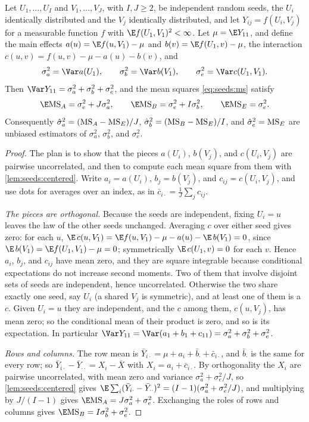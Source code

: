 \begin{refsection}
\begin{theorem}\label{thm:seeds:components}
Let $U_1,\dots,U_I$ and $V_1,\dots,V_J$, with $I,J\ge2$, be independent random seeds, the $U_i$ identically distributed and the $V_j$ identically distributed, and let $Y_{ij}=f(U_i,V_j)$ for a measurable function $f$ with $\E f(U_1,V_1)^2<\infty$. Let $\mu=\E Y_{11}$, and define the main effects $a(u)=\E f(u,V_1)-\mu$ and $b(v)=\E f(U_1,v)-\mu$, the interaction $c(u,v)=f(u,v)-\mu-a(u)-b(v)$, and
\[
\sigma_a^2=\Var a(U_1),\qquad\sigma_b^2=\Var b(V_1),\qquad\sigma_e^2=\Var c(U_1,V_1).
\]
Then $\Var Y_{11}=\sigma_a^2+\sigma_b^2+\sigma_e^2$, and the mean squares \eqref{eq:seeds:ms} satisfy
\[
\E\seedsMS A=\sigma_e^2+J\sigma_a^2,\qquad\E\seedsMS B=\sigma_e^2+I\sigma_b^2,\qquad\E\seedsMS E=\sigma_e^2 .
\]
Consequently $\hat\sigma_a^2=(\mathrm{MS}_{A}-\mathrm{MS}_{E})/J$, $\hat\sigma_b^2=(\mathrm{MS}_{B}-\mathrm{MS}_{E})/I$, and $\hat\sigma_e^2=\mathrm{MS}_{E}$ are unbiased estimators of $\sigma_a^2$, $\sigma_b^2$, and $\sigma_e^2$.
\end{theorem}

\begin{proof}
The plan is to show that the pieces $a(U_i)$, $b(V_j)$, and $c(U_i,V_j)$ are pairwise uncorrelated, and then to compute each mean square from them with \cref{lem:seeds:centered}. Write $a_i=a(U_i)$, $b_j=b(V_j)$, and $c_{ij}=c(U_i,V_j)$, and use dots for averages over an index, as in $\bar c_{i\cdot}=\frac1J\sum_jc_{ij}$.

\emph{The pieces are orthogonal.} Because the seeds are independent, fixing $U_i=u$ leaves the law of the other seeds unchanged. Averaging $c$ over either seed gives zero: for each $u$, $\E\,c(u,V_1)=\E f(u,V_1)-\mu-a(u)-\E\,b(V_1)=0$, since $\E\,b(V_1)=\E f(U_1,V_1)-\mu=0$; symmetrically $\E\,c(U_1,v)=0$ for each $v$. Hence $a_i$, $b_j$, and $c_{ij}$ have mean zero, and they are square integrable because conditional expectations do not increase second moments. Two of them that involve disjoint sets of seeds are independent, hence uncorrelated. Otherwise the two share exactly one seed, say $U_i$ (a shared $V_j$ is symmetric), and at least one of them is a $c$. Given $U_i=u$ they are independent, and the $c$ among them, $c(u,V_j)$, has mean zero; so the conditional mean of their product is zero, and so is its expectation. In particular $\Var Y_{11}=\Var(a_1+b_1+c_{11})=\sigma_a^2+\sigma_b^2+\sigma_e^2$.

\emph{Rows and columns.} The row mean is $\bar Y_{i\cdot}=\mu+a_i+\bar b_{\cdot}+\bar c_{i\cdot}$, and $\bar b_\cdot$ is the same for every row; so $\bar Y_{i\cdot}-\bar Y_{\cdot\cdot}=X_i-\bar X$ with $X_i=a_i+\bar c_{i\cdot}$. By orthogonality the $X_i$ are pairwise uncorrelated, with mean zero and variance $\sigma_a^2+\sigma_e^2/J$, so \cref{lem:seeds:centered} gives $\E\sum_i(\bar Y_{i\cdot}-\bar Y_{\cdot\cdot})^2=(I-1)(\sigma_a^2+\sigma_e^2/J)$, and multiplying by $J/(I-1)$ gives $\E\seedsMS A=J\sigma_a^2+\sigma_e^2$. Exchanging the roles of rows and columns gives $\E\seedsMS B=I\sigma_b^2+\sigma_e^2$.


\end{proof}
\end{refsection}
